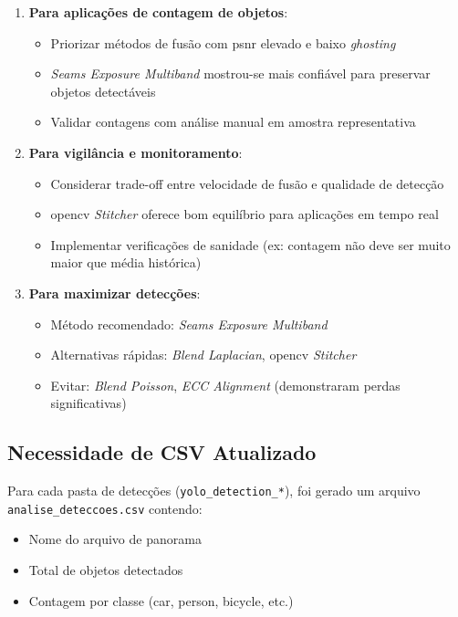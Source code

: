 \begin{enumerate}
    \item \textbf{Para aplicações de contagem de objetos}:
    \begin{itemize}
        \item Priorizar métodos de fusão com \gls{psnr} elevado e baixo \textit{ghosting}
        \item \textit{Seams Exposure Multiband} mostrou-se mais confiável para preservar objetos detectáveis
        \item Validar contagens com análise manual em amostra representativa
    \end{itemize}

    \item \textbf{Para vigilância e monitoramento}:
    \begin{itemize}
        \item Considerar trade-off entre velocidade de fusão e qualidade de detecção
        \item \gls{opencv} \textit{Stitcher} oferece bom equilíbrio para aplicações em tempo real
        \item Implementar verificações de sanidade (ex: contagem não deve ser muito maior que média histórica)
    \end{itemize}

    \item \textbf{Para maximizar detecções}:
    \begin{itemize}
        \item Método recomendado: \textit{Seams Exposure Multiband}
        \item Alternativas rápidas: \textit{Blend Laplacian}, \gls{opencv} \textit{Stitcher}
        \item Evitar: \textit{Blend Poisson}, \textit{ECC Alignment} (demonstraram perdas significativas)
    \end{itemize}
\end{enumerate}

\subsection{Necessidade de CSV Atualizado}

Para cada pasta de detecções (\texttt{yolo\_detection\_*}), foi gerado um arquivo \texttt{analise\_deteccoes.csv} contendo:

\begin{itemize}
    \item Nome do arquivo de panorama
    \item Total de objetos detectados
    \item Contagem por classe (car, person, bicycle, etc.)
\end{itemize}

